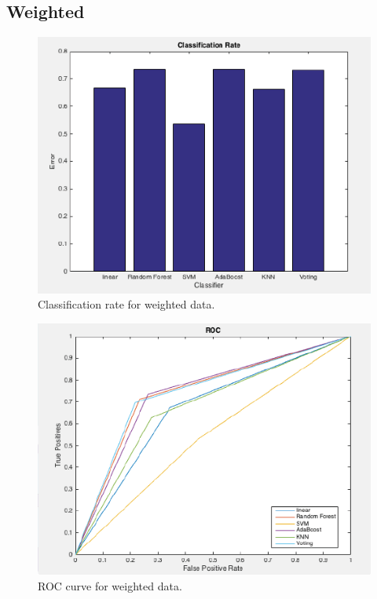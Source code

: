 \documentclass[11pt]{article} %
\begin{document}
\subsection{Weighted}
\begin{figure}[!htb]
	\includegraphics{WBar}
	\caption{Classification rate for weighted data.}
\end{figure}
\begin{figure}
	\includegraphics{WROC}
	\caption{ROC curve for weighted data.}
\end{figure}
\end{document}
